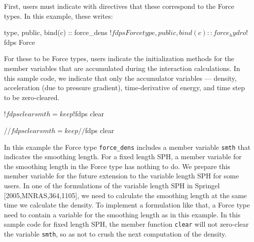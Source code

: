 \ifIF %
First, users must indicate with directives that these \structures correspond to the \textsf{Force} types. In this example, these writes:
\endifIF
\ifFtn %
\begin{screen}
\begin{spverbatim}
type, public, bind(c) :: force_dens !$fdps Force
type, public, bind(c) :: force_hydro !$fdps Force
\end{spverbatim}
\end{screen}
\endifFtn
\ifC %
\begin{screen}
\begin{spverbatim}
typedef struct force_dens { //$fdps Force
typedef struct force_hydro { //$fdps Force
\end{spverbatim}
\end{screen}
\endifC
\ifIF %
For these \structures to be \textsf{Force} types, users  indicate the initialization methods for the member variables that are accumulated during the interaction calculations. In this sample code, we indicate that only the accumulator variables ---  density, acceleration (due to pressure gradient), time-derivative of energy, and time step to be zero-cleared.
\endifIF
\ifFtn %
\begin{screen}
\begin{spverbatim}
!$fdps clear smth=keep
!$fdps clear
\end{spverbatim}
\end{screen}
\endifFtn
\ifC %
\begin{screen}
\begin{spverbatim}
//$fdps clear smth=keep
//$fdps clear
\end{spverbatim}
\end{screen}
\endifC
\ifIF %
In this example the \textsf{Force} type \texttt{force\_dens} includes a member variable \texttt{smth} that indicates the smoothing length. For a fixed length SPH, a member variable for the smoothing length in the \textsf{Force} type has nothing to do. We prepare this member variable for the future extension to the variable length SPH for some users. In one of the formulations of the variable length SPH in Springel [2005,MNRAS,364,1105], we need to calculate the smoothing length at the same time we calculate the density. To implement a formulation like that, a \textsf{Force} type need to contain a variable for the smoothing length as in this example. In this sample code for fixed length SPH, the member function \texttt{clear} will not zero-clear the variable \texttt{smth}, so as not to crush the next computation of the density.
\endifIF

